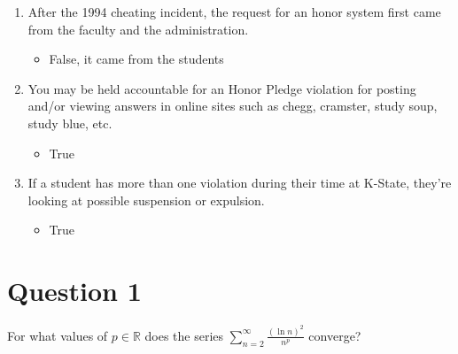 \documentclass[10pt,a4paper]{article}
\theoremstyle{definition}
\begin{document}
\begin{enumerate}[label = (\alph*)]
\begin{enumerate}[label = (\roman*)]
	\item After the 1994 cheating incident, the request for an honor system first came from the faculty and the administration.
		\begin{itemize}
		\item False, it came from the students
		\end{itemize}
	\item You may be held accountable for an Honor Pledge violation for posting and/or viewing answers in online sites such as chegg, cramster, study soup, study blue, etc.
		\begin{itemize}
		\item True
		\end{itemize}
	\item If a student has more than one violation during their time at K-State, they're looking at possible suspension or expulsion.
		\begin{itemize}
		\item True
		\end{itemize}			
	\end{enumerate}
\end{enumerate}

\newpage


\section*{Question 1}
For what values of $p \in \mathbb{R}$ does the series $\displaystyle \sum_{n = 2}^{\infty} \frac{(\ln n)^2}{n^p}$ converge?
\end{document}

